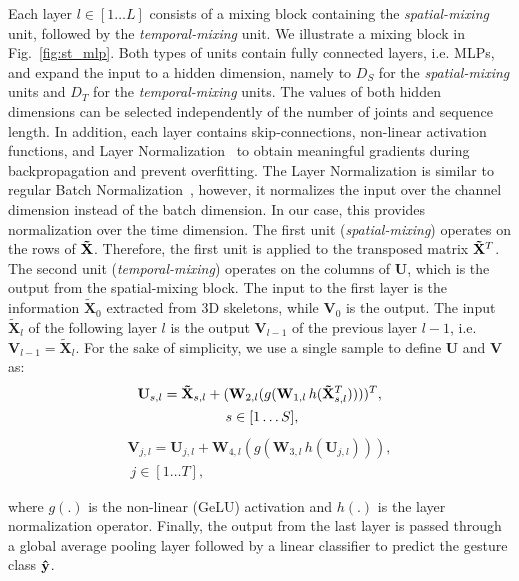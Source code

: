 \documentclass[letterpaper, 10 pt, conference]{ieeeconf}
\begin{document}
Each layer $l \in [1 \hdots L]$ consists of a mixing block containing the \textit{spatial-mixing} unit, followed by the \textit{temporal-mixing} unit. We illustrate a mixing block in Fig.~\ref{fig:st_mlp}. Both types of units contain fully connected layers, i.e. MLPs, and expand the input to a hidden dimension, namely to $D_S$ for the \textit{spatial-mixing} units and $D_T$ for the \textit{temporal-mixing} units. The values of both hidden dimensions can be selected independently of the number of joints and sequence length. In addition, each layer contains skip-connections, non-linear activation functions, and Layer Normalization~\cite{ba2016layer} to obtain meaningful gradients during backpropagation and prevent overfitting. The Layer Normalization is similar to regular Batch Normalization~\cite{pmlr-v37-ioffe15}, however, it normalizes the input over the channel dimension instead of the batch dimension. In our case, this provides normalization over the time dimension. The first unit (\textit{spatial-mixing}) operates on the rows of $\mathbf{\Tilde{X}}$. Therefore, the first unit is applied to the transposed matrix $\mathbf{\Tilde{X}}^T$. The second unit (\textit{temporal-mixing}) operates on the columns of $\mathbf{U}$, which is the output from the spatial-mixing block. The input to the first layer is the information $\mathbf{\tilde{X}}_0$ extracted from 3D skeletons, while $\textbf{V}_0$ is the output. The input $\mathbf{\tilde{X}}_l$ of the following layer $l$ is the output $\textbf{V}_{l-1}$ of the previous layer $l-1$, i.e. $\textbf{V}_{l-1}=\mathbf{\tilde{X}}_{l}$. For the sake of simplicity, we use a single sample to define $\mathbf{U}$ and $\mathbf{V}$ as:
\begin{equation}
\label{eq:spat_mix}
\begin{gathered}
    \textbf{U}_{s,l} =  \mathbf{\tilde{X}}_{s,l} + (\textbf{W}_{2,l}(g(\textbf{W}_{1,l}\, h(\mathbf{\Tilde{X}}^T_{s,l}))))^T, \\\
    s\in [1\dots S],
\end{gathered}
\end{equation}
\begin{equation}
\label{eq:temp_mix}
\begin{gathered}
    \textbf{V}_{j,l} =  \textbf{U}_{j,l} + \textbf{W}_{4,l}(g(\textbf{W}_{3,l}\, h(\mathbf{U}_{j,l}))), \\\
    j\in [1\dots T],
\end{gathered}
\end{equation}

where $g(.)$ is the non-linear (GeLU) activation and $h(.)$ is the layer normalization operator. Finally, the output from the last layer is passed through a global average pooling layer followed by a linear classifier to predict the gesture class $\mathbf{\Hat{y}}$.
\end{document}
